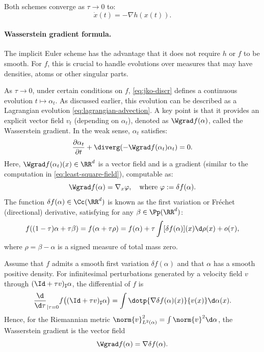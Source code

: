 Both schemes converge as $\tau \to 0$ to:
\begin{equation}
    \dot{x}(t) = -\nabla h(x(t)). \label{eq:grad-flow-classical}
\end{equation}


\paragraph{Wasserstein gradient formula.}

The implicit Euler scheme has the advantage that it does not require $h$ or $f$ to be smooth. For $f$, this is crucial to handle evolutions over measures that may have densities, atoms or other singular parts.

As $\tau \to 0$, under certain conditions on $f$, \eqref{eq:jko-discr} defines a continuous evolution $t \mapsto \alpha_t$. As discussed earlier, this evolution can be described as a Lagrangian evolution \eqref{eq:lagrangian-advection}. A key point is that it provides an explicit vector field $v_t$ (depending on $\alpha_t$), denoted as $\Wgrad f(\alpha)$, called the Wasserstein gradient. In the weak sense, $\alpha_t$ satisfies:
\begin{equation}
    \frac{\partial \alpha_t}{\partial t} + \diverg(-\Wgrad f(\alpha_t) \alpha_t) = 0. \label{eq:wassflow-pde}
\end{equation}
Here, $\Wgrad f(\alpha_t)(x) \in \RR^d$ is a vector field and is a gradient (similar to the computation in \eqref{eq:least-square-field}), computable as:
\begin{equation*}
    \Wgrad f(\alpha) = \nabla_x \varphi, \quad \text{where } \varphi := \delta f(\alpha).
\end{equation*}
The function $\delta f(\alpha) \in \Cc(\RR^d)$ is known as the first variation or Fr\'echet (directional) derivative, satisfying for any $\beta \in \Pp(\RR^d)$:
\begin{equation*}
    f((1-\tau)\alpha + \tau \beta) = f(\alpha + \tau \rho) = f(\alpha) + \tau \int [\delta f(\alpha)](x) \d \rho(x) + o(\tau),
\end{equation*}
where $\rho = \beta - \alpha$ is a signed measure of total mass zero.
%
\begin{proposition}\label{prop-formal-wass-gradient}
	Assume that $f$ admits a smooth first variation $\delta f(\alpha)$ and that $\alpha$ has a smooth positive density. For infinitesimal perturbations generated by a velocity field $v$ through $(\Id+\tau v)_\sharp\alpha$, the differential of $f$ is
	\[
		\frac{\d}{\d\tau}_{|\tau=0}
		f\big((\Id+\tau v)_\sharp\alpha\big)
		=
		\int \dotp{\nabla \delta f(\alpha)(x)}{v(x)}\d\alpha(x).
	\]
	Hence, for the Riemannian metric $\norm{v}_{L^2(\alpha)}^2=\int \norm{v}^2\d\alpha$, the Wasserstein gradient is the vector field
	\[
		\Wgrad f(\alpha)=\nabla \delta f(\alpha).
	\]
\end{proposition}
